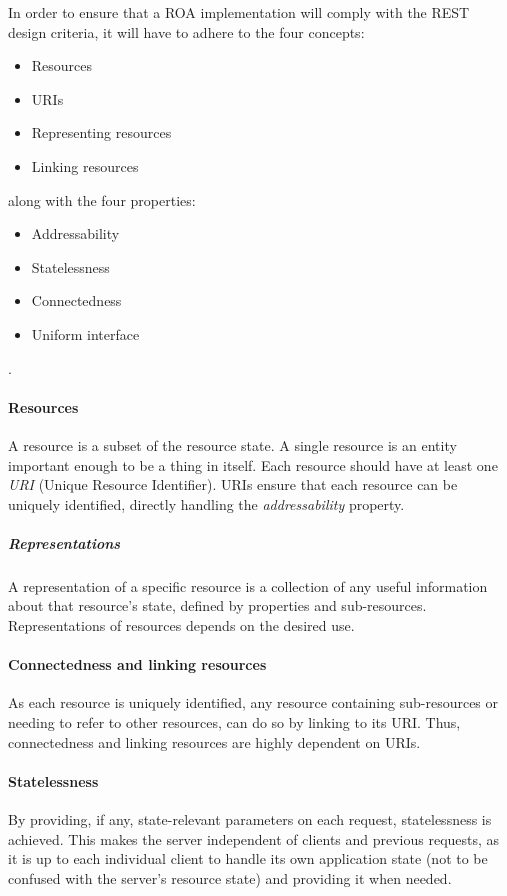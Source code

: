 In order to ensure that a ROA implementation will comply with the REST design criteria, it will have to adhere to the four concepts\cite[Chapter 4]{restful_web_services}:
\begin{itemize}
\item Resources
\item URIs
\item Representing resources
\item Linking resources
\end{itemize}
along with the four properties:
\begin{itemize}
\item Addressability
\item Statelessness
\item Connectedness
\item Uniform interface
\end{itemize}.

\paragraph{Resources} A resource is a subset of the resource state.
A single resource is an entity important enough to be a thing in itself.
Each resource should have at least one \textit{URI} (Unique Resource Identifier).
URIs ensure that each resource can be uniquely identified, directly handling the \textit{addressability} property.

\subparagraph{Representations} A representation of a specific resource is a collection of any useful information about that resource's state, defined by properties and sub-resources.
Representations of resources depends on the desired use.


\paragraph{Connectedness and linking resources} As each resource is uniquely identified, any resource containing sub-resources or needing to refer to other resources, can do so by linking to its URI.
Thus, connectedness and linking resources are highly dependent on URIs.

\paragraph{Statelessness} By providing, if any, state-relevant parameters on each request, statelessness is achieved.
This makes the server independent of clients and previous requests, as it is up to each individual client to handle its own application state (not to be confused with the server's resource state) and providing it when needed.

